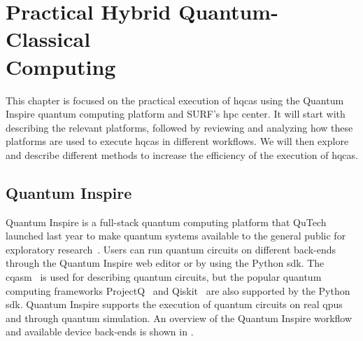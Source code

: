 \chapter[Practical Hybrid Quantum-Classical Computing]{Practical Hybrid Quantum-Classical\\Computing} \label{chap:practical-hybrid-quantum-classical-computing}
This chapter is focused on the practical execution of \glspl{hqca} using the Quantum Inspire quantum computing platform and SURF's \gls{hpc} center.
It will start with describing the relevant platforms, followed by reviewing and analyzing how these platforms are used to execute \glspl{hqca} in different workflows.
We will then explore and describe different methods to increase the efficiency of the execution of \glspl{hqca}.

\section{Quantum Inspire}
Quantum Inspire is a full-stack quantum computing platform that QuTech launched last year to make quantum systems available to the general public for exploratory research~\cite{last2020quantum}.
Users can run quantum circuits on different back-ends through the Quantum Inspire web editor or by using the Python \gls{sdk}.
The \gls{cqasm}~\cite{khammassi2018cqasm} is used for describing quantum circuits, but the popular quantum computing frameworks ProjectQ~\cite{steiger2018projectq} and Qiskit~\cite{qiskit} are also supported by the Python \gls{sdk}.
Quantum Inspire supports the execution of quantum circuits on real \glspl{qpu} and through quantum simulation.
An overview of the Quantum Inspire workflow and available device back-ends is shown in .

